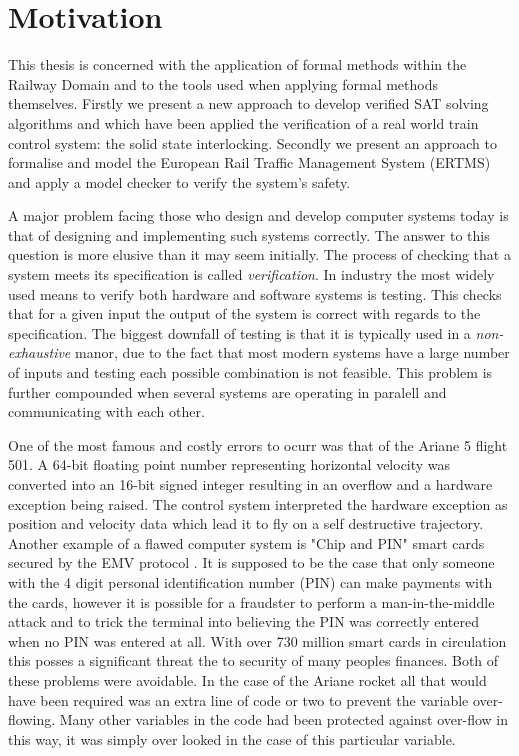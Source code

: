 

\section{Motivation}

This thesis is concerned with the application of formal methods within the Railway Domain and to the tools used when applying formal methods themselves. Firstly we present a new approach to develop verified SAT solving algorithms and which have been applied the verification of a real world train control system: the solid state interlocking. Secondly we present an approach to formalise and model the European Rail Traffic Management System (ERTMS) and apply a model checker to verify the system's safety.

A major problem facing those who design and develop computer systems today is  that of designing and implementing such systems correctly. The answer to this question is more elusive than it may seem initially. The process of checking that a system meets its specification is called \emph{verification}. In industry the most widely used means to verify both hardware and software systems is testing. This checks that for a given input the output of the system is correct with regards to the specification. The biggest downfall of testing is that it is typically used in a \emph{non-exhaustive} manor, due to the fact that most modern systems have a large number of inputs and testing each possible combination is not feasible. This problem is further compounded when several systems are operating in paralell and communicating with each other.

One of the most famous and costly errors to ocurr was that of the Ariane 5 flight 501\cite{GL97}. A 64-bit floating point number representing horizontal velocity was converted into an 16-bit signed integer resulting in an overflow and a hardware exception being raised. The control system interpreted the hardware exception as position and velocity data which lead it to fly on a self destructive trajectory. Another example of a flawed computer system is "Chip and PIN" smart cards secured by the EMV protocol \cite{JM10}. It is supposed to be the case that only someone with the 4 digit personal identification number (PIN) can make payments with the cards, however it is possible for a fraudster to perform a man-in-the-middle attack and to trick the terminal into believing the PIN was correctly entered when no PIN was entered at all. With over 730 million smart cards in circulation this posses a significant threat the to security of many peoples finances. Both of these problems were avoidable. In the case of the Ariane rocket all that would have been required was an extra line of code or two to prevent the variable over-flowing. Many other variables in the code had been protected against over-flow in this way, it was simply over looked in the case of this particular variable.


